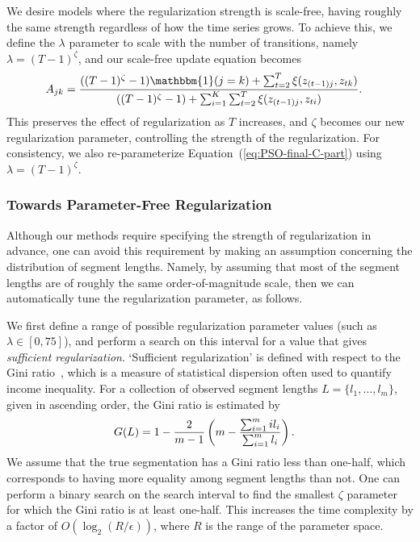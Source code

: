 \documentclass[letterpaper]{article}
\begin{document}
We desire models where the regularization strength is scale-free, having roughly the same strength regardless of how the time series grows. To achieve this, we define the $\lambda$ parameter to scale with the number of transitions, namely $\lambda = (T-1)^\zeta$, and our scale-free update equation becomes
\begin{align}\label{eq:SCALE-FREE-MAP}
  \setlength{\abovedisplayskip}{0pt}
  \setlength{\belowdisplayskip}{0pt}
    A_{jk} &= \frac{((T - 1)^{\zeta}-1){\mathbbm{1}(j = k)} + \sum_{t=2}^{T} \xi(z_{(t-1)j}, z_{tk})}   
    {((T - 1)^{\zeta} - 1) + \sum_{i=1}^{K}\sum_{t=2}^{T} \xi(z_{(t-1)j}, z_{ti})}.
\end{align}
This preserves the effect of regularization as $T$ increases, and $\zeta$
becomes our new regularization parameter, controlling the strength of the
regularization. For consistency, we also re-parameterize
Equation~(\ref{eq:PSO-final-C-part}) using $\lambda = (T-1)^\zeta$.

\subsubsection{Towards Parameter-Free Regularization}\label{sec:param-free}

Although our methods require specifying the strength of regularization in advance, one can avoid this requirement by making an assumption concerning the distribution of segment lengths. Namely, by assuming that most of the segment lengths are of roughly the same order-of-magnitude scale, then we can automatically tune the regularization parameter, as follows.

We first define a range of possible regularization parameter values (such as
$\lambda \in [0, 75]$), and perform a search on this interval for a value that
gives \emph{sufficient regularization}. `Sufficient regularization' is defined
with respect to the Gini ratio~\cite{gini1936,wiki:1}, which is a measure of
statistical dispersion often used to quantify income inequality. For a
collection of observed segment lengths $L = \{l_1, \ldots, l_m\}$, given in
ascending order, the Gini ratio is estimated by
\begin{align*}
  \setlength{\abovedisplayskip}{0pt}
  \setlength{\belowdisplayskip}{0pt}
    G(L) &= 1 - \frac{2}{m-1}\left(m - \frac{\sum_{i=1}^{m} i l_i}{\sum_{i=1}^{m} l_i}\right).
\end{align*}
We assume that the true segmentation has a Gini ratio less than
one-half, which corresponds to having more equality among segment lengths than
not. One can perform a binary search on the search interval to find the smallest
$\zeta$ parameter for which the Gini ratio is at least one-half. This increases
the time complexity by a factor of $O(\log_2 (R / \epsilon))$, where $R$ is the
range of the parameter space.
\end{document}
